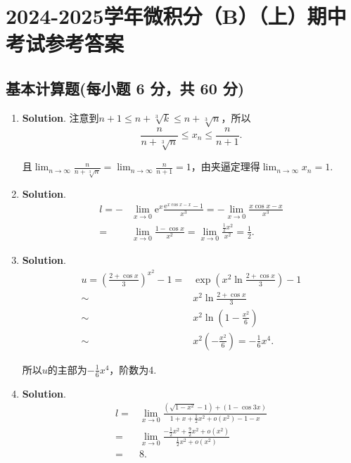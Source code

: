 \documentclass[../Main.tex]{subfiles}
\begin{document}
\chapter{2024-2025学年微积分（B）（上）期中考试参考答案}
\section{基本计算题(每小题 6 分，共 60 分)}
\begin{enumerate}
    \item \textbf{Solution}. 注意到$n+1\leq n+\sqrt[3]{k}\leq n+\sqrt[3]{n}$，所以
          \[
              \frac{n}{n+\sqrt[3]{n}}\leq x_{n}\leq \frac{n}{n+1}.
          \]

          且$\lim_{n\to\infty}\frac{n}{n+\sqrt[3]{n}}=\lim_{n\to\infty}\frac{n}{n+1}=
              1$，由夹逼定理得$\lim_{n\to\infty}x_{n}=1$.

    \item \textbf{Solution}.
          \[
              \begin{aligned}
                  l=- & \lim_{x\to 0}\mathrm{e}^{x}\frac{\mathrm{e}^{x\cos x-x}-1}{x^3}=-\lim_{x\to0}\frac{x\cos x-x}{x^3} \\
                  =   & \lim_{x\to0}\frac{1-\cos x}{x^2}=\lim_{x\to0}\frac{\frac{1}{2}x^2}{x^2}=\frac{1}{2}.
              \end{aligned}
          \]

    \item \textbf{Solution}.
          \[
              \begin{aligned}
                  u=\left(\frac{2+\cos x}{3}\right)^{x^2}-1= & \exp\left({x^2\ln\frac{2+\cos x}{3}}\right)-1       \\
                  \sim                                       & x^{2}\ln\frac{2+\cos x}{3}                          \\
                  \sim                                       & x^{2}\ln\left(1-\frac{x^2}{6}\right)                \\
                  \sim                                       & x^{2}\left(-\frac{x^2}{6}\right)=-\frac{1}{6}x^{4}.
              \end{aligned}
          \]

          所以$u$的主部为$-\frac{1}{6}x^{4}$，阶数为4.

    \item \textbf{Solution}.
          \[
              \begin{aligned}
                  l= & \lim_{x\to0}\frac{(\sqrt{1-x^2}-1)+(1-\cos 3x)}{1+x+\frac{1}{2}x^2+o(x^2)-1-x}  \\
                  =  & \lim_{x\to0}\frac{-\frac{1}{2}x^2+\frac{9}{2}x^2+o(x^2)}{\frac{1}{2}x^2+o(x^2)} \\
                  =  & 8.
              \end{aligned}
          \]


\end{enumerate}
\end{document}
